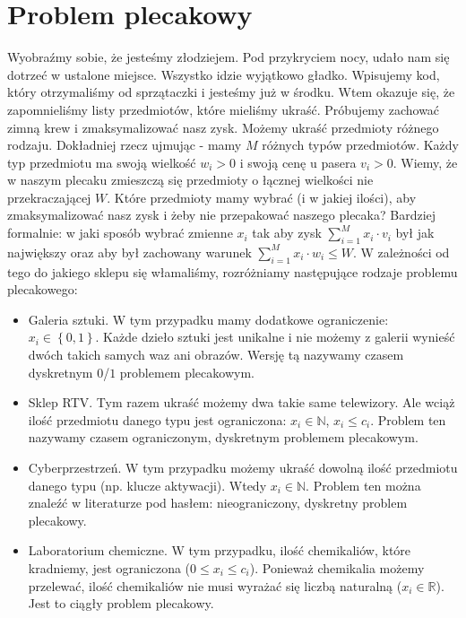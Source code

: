 \section{Problem plecakowy}

\label{sec:plecaki}

Wyobraźmy sobie, że jesteśmy złodziejem.
Pod przykryciem nocy, udało nam się dotrzeć w ustalone miejsce.
Wszystko idzie wyjątkowo gładko.
Wpisujemy kod, który otrzymaliśmy od sprzątaczki i jesteśmy już w środku.
Wtem okazuje się, że zapomnieliśmy listy przedmiotów, które mieliśmy ukraść.
Próbujemy zachować zimną krew i zmaksymalizować nasz zysk.
Możemy ukraść przedmioty różnego rodzaju.
Dokładniej rzecz ujmując - mamy $M$ różnych typów przedmiotów.
Każdy typ przedmiotu ma swoją wielkość $w_i > 0$ i swoją cenę u pasera $v_i > 0$.
Wiemy, że w naszym plecaku zmieszczą się przedmioty o łącznej wielkości nie przekraczającej $W$.
Które przedmioty mamy wybrać (i w jakiej ilości), aby zmaksymalizować nasz zysk i żeby nie przepakować naszego plecaka?
Bardziej formalnie: w jaki sposób wybrać zmienne $x_i$ tak aby zysk $\sum_{i=1}^{M} x_i \cdot v_i$ był jak największy oraz aby był
zachowany warunek $\sum_{i=1}^{M} x_i \cdot w_i \leq W$.
W zależności od tego do jakiego sklepu się włamaliśmy, rozróżniamy następujące rodzaje problemu plecakowego:
\begin{itemize}
  \item Galeria sztuki.
  W tym przypadku mamy dodatkowe ograniczenie: $x_i \in \left \{ 0, 1 \right \}$.
  Każde dzieło sztuki jest unikalne i nie możemy z galerii wynieść dwóch takich samych waz ani obrazów.
  Wersję tą nazywamy czasem dyskretnym $0$/$1$ problemem plecakowym.
  \item Sklep RTV.
  Tym razem ukraść możemy dwa takie same telewizory.
  Ale wciąż ilość przedmiotu danego typu jest ograniczona: $x_i \in \mathbb{N}$, $x_i \leq c_i$.
  Problem ten nazywamy czasem ograniczonym, dyskretnym problemem plecakowym.
  \item Cyberprzestrzeń.
  W tym przypadku możemy ukraść dowolną ilość przedmiotu danego typu (np. klucze aktywacji).
  Wtedy $x_i \in \mathbb{N}$.
  Problem ten można znaleźć w literaturze pod hasłem: nieograniczony, dyskretny problem plecakowy.
  \item Laboratorium chemiczne.
  W tym przypadku, ilość chemikaliów, które kradniemy, jest ograniczona ($0 \leq x_i \leq c_i$).
  Ponieważ chemikalia możemy przelewać, ilość chemikaliów nie musi wyrażać się liczbą naturalną ($x_i \in \mathbb{R}$).
  Jest to ciągły problem plecakowy.
\end{itemize}

